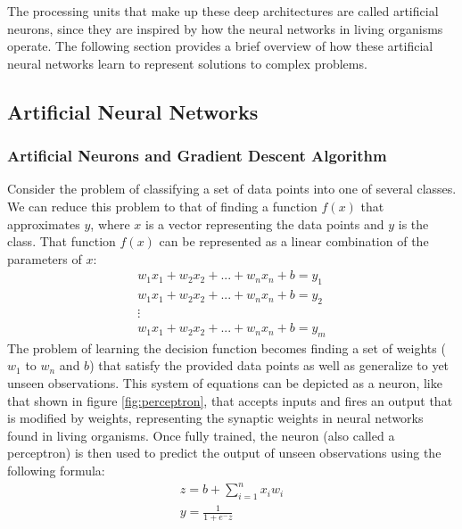 \documentclass{article}
\begin{document}
	The processing units that make up these deep architectures are called artificial neurons, since they are inspired by how the neural networks in living organisms operate. The following section provides a brief overview of how these artificial neural networks learn to represent solutions to complex problems.
	
	\subsection{Artificial Neural Networks}
	
	\subsubsection{Artificial Neurons and Gradient Descent Algorithm}
	
	Consider the problem of classifying a set of data points into one of several classes. We can reduce this problem to that of finding a function $f(x)$ that approximates $y$, where $x$ is a vector representing the data points and $y$ is the class. That function $f(x)$ can be represented as a linear combination of the parameters of $x$:
	\begin{gather*}
	w_1 x_1 + w_2 x_2 + ... + w_n x_n + b = y_1\\
	w_1 x_1 + w_2 x_2 + ... + w_n x_n + b = y_2\\
	\vdots\\ 
	w_1 x_1 + w_2 x_2 + ... + w_n x_n + b = y_m
	\end{gather*}
	The problem of learning the decision function becomes finding a set of weights ($w_1$ to $w_n$ and $b$) that satisfy the provided data points as well as generalize to yet unseen observations\cite{Le15atutorial}. This system of equations can be depicted as a neuron, like that shown in figure \ref{fig:perceptron}, that accepts inputs and fires an output that is modified by weights, representing the synaptic weights in neural networks found in living organisms. Once fully trained, the neuron (also called a perceptron) is then used to predict the output of unseen observations using the following formula:
	\begin{gather}
		z = b + \sum\limits_{i=1}^n x_i w_i\\
		y = \frac{1}{1+e^-z}
	\end{gather}
	
\end{document}
